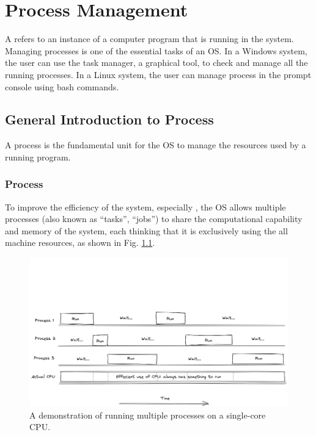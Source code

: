 \chapter{Process Management} \label{ch:pm}

A  refers to an instance of a computer program that is running in the system. Managing processes is one of the essential tasks of an OS. In a Windows system, the user can use the task manager, a graphical tool, to check and manage all the running processes. In a Linux system, the user can manage process in the prompt console using bash commands.

\section{General Introduction to Process}

A process is the fundamental unit for the OS to manage the resources used by a running program.

\subsection{Process}

To improve the efficiency of the system, especially , the OS allows multiple processes (also known as ``tasks'', ``jobs'') to share the computational capability and memory of the system, each thinking that it is exclusively using the all machine resources, as shown in Fig. \ref{ch:pm:fig:processflow}.

\begin{figure}[!htb]
	\centering
	\includegraphics[width=350pt]{chapters/part-1/figures/processflow.png}
	\caption{A demonstration of running multiple processes on a single-core CPU.} \label{ch:pm:fig:processflow}
\end{figure}

